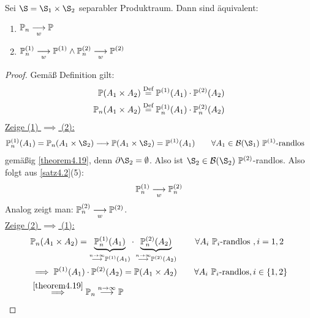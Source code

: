 \begin{theorem}\label{thoerem4.20}
Sei $\S=\S_1\times\S_2$ separabler Produktraum. Dann sind äquivalent:
\begin{enumerate}[label=(\arabic*)]
\item $\begin{aligned}
\P_n\stackrelnew{w}{}{\longrightarrow}\P
\end{aligned}$
\item $\begin{aligned}
\P_n^{(1)}\stackrelnew{w}{}{\longrightarrow}\P^{(1)}\wedge
\P_n^{(2)}\stackrelnew{w}{}{\longrightarrow}\P^{(2)}
\end{aligned}$
\end{enumerate}
\end{theorem}
\begin{proof}
Gemäß Definition gilt:
\begin{align*}
\P(A_1\times A_2)&\stackeq{\text{Def}}\P^{(1)}(A_1)\cdot\P^{(2)}(A_2)\\
\P_n(A_1\times A_2)&\stackeq{\text{Def}}\P_n^{(1)}(A_1)\cdot\P_n^{(2)}(A_2)\\
\end{align*}
\underline{Zeige (1) $\implies$ (2):}
\begin{align*}
\P_n^{(1)}(A_1)&=\P_n(A_1\times\S_2)\stackrel{}{\longrightarrow}\P(A_1\times\S_2)=\P^{(1)}(A_1)
\qquad\forall A_1\in\B(\S_1)~\P^{(1)}\text{-randlos}
\end{align*}
gemäßig \ref{theorem4.19}, denn $\partial\S_2=\emptyset$. Also ist $\S_2\in\B(\S_2)~\P^{(2)}$-randlos. Also folgt aus \ref{satz4.2}(5):
\begin{align*}
\P_n^{(1)}\stackrelnew{w}{}{\longrightarrow}\P_n^{(2)}
\end{align*}
Analog zeigt man: $\P_n^{(2)}\stackrelnew{w}{}{\longrightarrow}\P^{(2)}$.\\

\underline{Zeige (2) $\implies$ (1):}
\begin{align*}
&\P_n(A_1\times A_2)=\underbrace{\P_n^{(1)}(A_1)}_{\stackrel{n\to\infty}{\longrightarrow}\P^{(1)}(A_1)}\cdot\underbrace{\P_n^{(2)}(A_2)}_{\stackrel{n\to\infty}{\longrightarrow}\P^{(2)}(A_2)}\qquad\forall A_i~\P_i\text{-randlos },i=1,2\\
&\implies
\P^{(1)}(A_1)\cdot\P^{(2)}(A_2)=\P(A_1\times A_2)\qquad\forall A_i~\P_i\text{-randlos},i\in\lbrace1,2\rbrace\\
&\stackrel{\ref{theorem4.19}}{\implies}\P_n\stackrel{n\to\infty}{\longrightarrow}\P
\end{align*}


\end{proof}